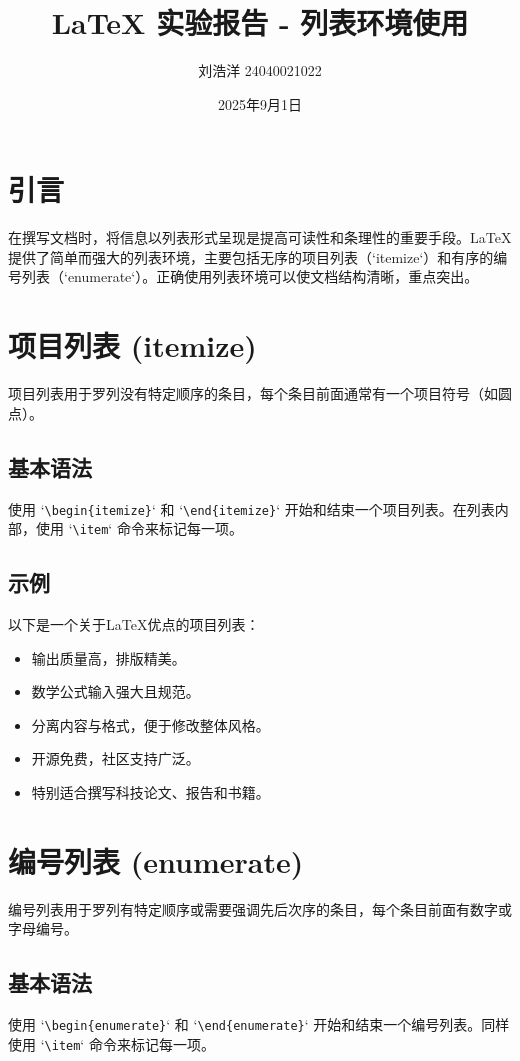 \documentclass{article}
\title{LaTeX 实验报告 - 列表环境使用}
\author{刘浩洋 24040021022}
\date{2025年9月1日}
\begin{document}
\maketitle

\section{引言}
在撰写文档时，将信息以列表形式呈现是提高可读性和条理性的重要手段。LaTeX提供了简单而强大的列表环境，主要包括无序的项目列表（`itemize`）和有序的编号列表（`enumerate`）。正确使用列表环境可以使文档结构清晰，重点突出。

\section{项目列表 (itemize)}
项目列表用于罗列没有特定顺序的条目，每个条目前面通常有一个项目符号（如圆点）。

\subsection{基本语法}
使用 `\texttt{\textbackslash begin\{itemize\}}` 和 `\texttt{\textbackslash end\{itemize\}}` 开始和结束一个项目列表。在列表内部，使用 `\texttt{\textbackslash item}` 命令来标记每一项。

\subsection{示例}
以下是一个关于LaTeX优点的项目列表：

\begin{itemize}
    \item 输出质量高，排版精美。
    \item 数学公式输入强大且规范。
    \item 分离内容与格式，便于修改整体风格。
    \item 开源免费，社区支持广泛。
    \item 特别适合撰写科技论文、报告和书籍。
\end{itemize}

\section{编号列表 (enumerate)}
编号列表用于罗列有特定顺序或需要强调先后次序的条目，每个条目前面有数字或字母编号。

\subsection{基本语法}
使用 `\texttt{\textbackslash begin\{enumerate\}}` 和 `\texttt{\textbackslash end\{enumerate\}}` 开始和结束一个编号列表。同样使用 `\texttt{\textbackslash item}` 命令来标记每一项。
\end{document}
